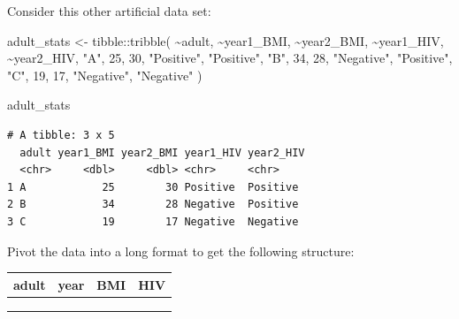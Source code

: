 \documentclass[
  letterpaper,
  DIV=11,
  numbers=noendperiod]{scrreprt}
\newenvironment{Shaded}{\begin{snugshade}}{\end{snugshade}}
\newcommand{\DecValTok}[1]{\textcolor[rgb]{0.68,0.00,0.00}{#1}}
\newcommand{\FunctionTok}[1]{\textcolor[rgb]{0.28,0.35,0.67}{#1}}
\newcommand{\NormalTok}[1]{\textcolor[rgb]{0.00,0.23,0.31}{#1}}
\newcommand{\OtherTok}[1]{\textcolor[rgb]{0.00,0.23,0.31}{#1}}
\newcommand{\SpecialCharTok}[1]{\textcolor[rgb]{0.37,0.37,0.37}{#1}}
\newcommand{\StringTok}[1]{\textcolor[rgb]{0.13,0.47,0.30}{#1}}
\begin{document}
\begin{tcolorbox}[enhanced jigsaw, title=\textcolor{quarto-callout-tip-color}{\faLightbulb}\hspace{0.5em}{Practice}, colbacktitle=quarto-callout-tip-color!10!white, leftrule=.75mm, arc=.35mm, opacityback=0, bottomrule=.15mm, rightrule=.15mm, toptitle=1mm, breakable, toprule=.15mm, colback=white, coltitle=black, colframe=quarto-callout-tip-color-frame, bottomtitle=1mm, titlerule=0mm, left=2mm, opacitybacktitle=0.6]

Consider this other artificial data set:

\begin{Shaded}
\begin{Highlighting}[]
\NormalTok{adult\_stats }\OtherTok{\textless{}{-}} 
\NormalTok{  tibble}\SpecialCharTok{::}\FunctionTok{tribble}\NormalTok{(}
    \SpecialCharTok{\textasciitilde{}}\NormalTok{adult,  }\SpecialCharTok{\textasciitilde{}}\NormalTok{year1\_BMI,  }\SpecialCharTok{\textasciitilde{}}\NormalTok{year2\_BMI,  }\SpecialCharTok{\textasciitilde{}}\NormalTok{year1\_HIV,  }\SpecialCharTok{\textasciitilde{}}\NormalTok{year2\_HIV,}
       \StringTok{"A"}\NormalTok{,          }\DecValTok{25}\NormalTok{,          }\DecValTok{30}\NormalTok{,  }\StringTok{"Positive"}\NormalTok{,  }\StringTok{"Positive"}\NormalTok{,}
       \StringTok{"B"}\NormalTok{,          }\DecValTok{34}\NormalTok{,          }\DecValTok{28}\NormalTok{,  }\StringTok{"Negative"}\NormalTok{,  }\StringTok{"Positive"}\NormalTok{,}
       \StringTok{"C"}\NormalTok{,          }\DecValTok{19}\NormalTok{,          }\DecValTok{17}\NormalTok{,  }\StringTok{"Negative"}\NormalTok{,  }\StringTok{"Negative"}
\NormalTok{  )}


\NormalTok{adult\_stats}
\end{Highlighting}
\end{Shaded}

\begin{verbatim}
# A tibble: 3 x 5
  adult year1_BMI year2_BMI year1_HIV year2_HIV
  <chr>     <dbl>     <dbl> <chr>     <chr>    
1 A            25        30 Positive  Positive 
2 B            34        28 Negative  Positive 
3 C            19        17 Negative  Negative 
\end{verbatim}

Pivot the data into a long format to get the following structure:

\begin{longtable}[]{@{}llll@{}}
\toprule\noalign{}
adult & year & BMI & HIV \\
\midrule\noalign{}
\endhead
\bottomrule\noalign{}
\endlastfoot
& & & \\
& & & \\
& & & \\
\end{longtable}


\end{tcolorbox}
\end{document}
